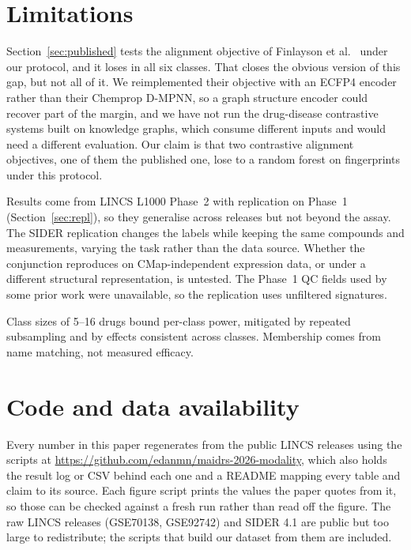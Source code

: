 \documentclass[conference]{IEEEtran}
\begin{document}
\section*{Limitations}

Section~\ref{sec:published} tests the alignment objective of
Finlayson et al.~\cite{finlayson2021} under our protocol, and it loses in all
six classes. That closes the obvious version of this gap, but not all of it. We
reimplemented their objective with an ECFP4 encoder rather than their Chemprop
D-MPNN, so a graph structure encoder could recover part of the margin, and we
have not run the drug-disease contrastive systems built on knowledge graphs,
which consume different inputs and would need a different evaluation. Our claim
is that two contrastive alignment objectives, one of them the published one,
lose to a random forest on fingerprints under this protocol.

Results come from LINCS L1000 Phase~2 with replication on
Phase~1 (Section~\ref{sec:repl}), so they generalise across releases but not
beyond the assay. The SIDER replication changes the labels while keeping the same
compounds and measurements, varying the task rather than the data source. Whether
the conjunction reproduces on CMap-independent expression data, or under a
different structural representation, is untested. The Phase~1 QC fields used by
some prior work were unavailable, so the replication uses unfiltered signatures.

Class sizes of 5--16 drugs bound per-class
power, mitigated by repeated subsampling and by effects consistent across
classes. Membership comes from name matching, not measured efficacy.

\section*{Code and data availability}

Every number in this paper regenerates from the public LINCS releases using the
scripts at \url{https://github.com/edanmn/maidrs-2026-modality}, which also
holds the result log or CSV behind each one and a README mapping every table and
claim to its source. Each figure script prints the values the paper quotes from
it, so those can be checked against a fresh run rather than read off the figure. The raw LINCS releases (GSE70138, GSE92742)
and SIDER 4.1 are public but too large to redistribute; the scripts that build
our dataset from them are included.
\end{document}
